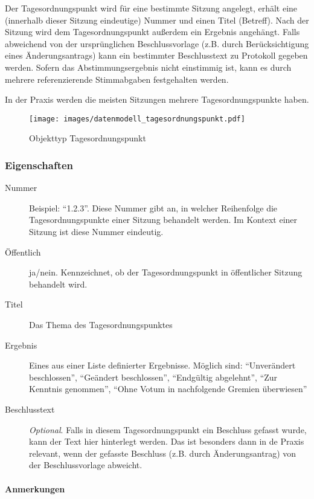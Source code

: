 \documentclass[,a4paper]{article}
\makeatletter
\def\maxwidth{\ifdim\Gin@nat@width>\linewidth\linewidth
\else\Gin@nat@width\fi}
\let\Oldincludegraphics\includegraphics
\renewcommand{\includegraphics}[1]{\Oldincludegraphics[width=\maxwidth]{#1}}
\makeatother
\begin{document}
Der Tagesordnungspunkt wird für eine bestimmte Sitzung angelegt, erhält
eine (innerhalb dieser Sitzung eindeutige) Nummer und einen Titel
(Betreff). Nach der Sitzung wird dem Tagesordnungspunkt außerdem ein
Ergebnis angehängt. Falls abweichend von der ursprünglichen
Beschlussvorlage (z.B. durch Berücksichtigung eines Änderungsantrags)
kann ein bestimmter Beschlusstext zu Protokoll gegeben werden. Sofern
das Abstimmungsergebnis nicht einstimmig ist, kann es durch mehrere
referenzierende Stimmabgaben festgehalten werden.

In der Praxis werden die meisten Sitzungen mehrere Tagesordnungspunkte
haben.

\begin{figure}[htbp]
\centering
\texttt{[image: images/datenmodell\_tagesordnungspunkt.pdf]}
\caption{Objekttyp Tagesordnungspunkt}
\end{figure}

\subsubsection{Eigenschaften}

\begin{description}
\item[Nummer]
Beispiel: ``1.2.3''. Diese Nummer gibt an, in welcher Reihenfolge die
Tagesordnungspunkte einer Sitzung behandelt werden. Im Kontext einer
Sitzung ist diese Nummer eindeutig.
\item[Öffentlich]
ja/nein. Kennzeichnet, ob der Tagesordnungspunkt in öffentlicher Sitzung
behandelt wird.
\item[Titel]
Das Thema des Tagesordnungspunktes
\item[Ergebnis]
Eines aus einer Liste definierter Ergebnisse. Möglich sind:
``Unverändert beschlossen'', ``Geändert beschlossen'', ``Endgültig
abgelehnt'', ``Zur Kenntnis genommen'', ``Ohne Votum in nachfolgende
Gremien überwiesen''
\item[Beschlusstext]
\emph{Optional}. Falls in diesem Tagesordnungspunkt ein Beschluss
gefasst wurde, kann der Text hier hinterlegt werden. Das ist besonders
dann in de Praxis relevant, wenn der gefasste Beschluss (z.B. durch
Änderungsantrag) von der Beschlussvorlage abweicht.
\end{description}

\paragraph{Anmerkungen}
\end{document}
